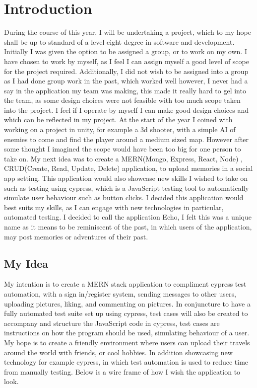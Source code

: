 \chapter{Introduction}\label{chap:intro}
During the course of this year, I will be undertaking a project, which to my hope shall be up to standard of a level eight degree in software and development. Initially I was given the option to be assigned a group, or to work on my own. I have chosen to work by myself, as I feel I can assign myself a good level of scope for the project required. Additionally, I did not wish to be assigned into a group as I had done group work in the past, which worked well however, I never had a say in the application my team was making, this made it really hard to gel into the team, as some design choices were not feasible with too much scope taken into the project. I feel if I operate by myself I can make good design choices and which can be reflected in my project. At the start of the year I coined with working on a project in unity, for example a 3d shooter, with a simple AI of enemies to come and find the player around a medium sized map. However after some thought I imagined the scope would have been too big for one person to take on. My next idea was to create a MERN(Mongo, Express, React, Node) \cite{mern}, CRUD(Create, Read, Update, Delete) \cite{crud} application, to upload memories in a social app setting. This application would also showcase new skills I wished to take on such as testing using cypress, which is a JavaScript testing tool to automatically simulate user behaviour such as button clicks. I decided this application would best suits my skills, as I can engage with new technologies in particular, automated testing. I decided to call the application Echo, I felt this was a unique name as it means to be reminiscent of the past, in which users of the application, may post memories or adventures of their past.

\section{My Idea}\label{section:idea}
My intention is to create a MERN stack application to compliment cypress test automation, with a sign in/register system, sending messages to other users, uploading pictures, liking, and commenting on pictures. In conjuncture to have a fully automated test suite set up using cypress, test cases will also be created to accompany and structure the JavaScript code in cypress, test cases are instructions on how the program should be used, simulating behaviour of a user. My hope is to create a friendly environment where users can upload their travels around the world with friends, or cool hobbies. In addition showcasing new technology for example cypress, in which test automation is used to reduce time from manually testing. Below is a wire frame of how I wish the application to look.

